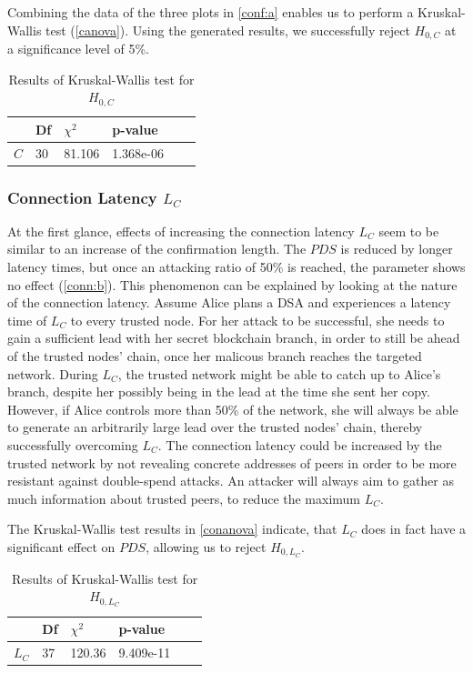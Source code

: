 \documentclass[a4paper,12pt,twoside]{report}
\begin{document}
Combining the data of the three plots in \autoref{conf:a} enables us to perform a Kruskal-Wallis test (\autoref{canova}). Using the generated results, we successfully reject $H_{0,C}$ at a significance level of 5\%.
\begin{table}[hb]
\centering
\begin{tabular}{|l|l|l|l|l|l|} \hline
& Df & $\chi^{2}$ & p-value \\ \hline
$C$ & 30 & 81.106 & 1.368e-06 \\ \hline
\end{tabular}
\caption{Results of Kruskal-Wallis test for $H_{0,C}$}
\label{canova}
\end{table}
\subsubsection{Connection Latency $L_C$}
At the first glance, effects of increasing the connection latency $L_C$ seem to be similar to an increase of the confirmation length. The $PDS$ is reduced by longer latency times, but once an attacking ratio of 50\% is reached, the parameter shows no effect (\autoref{conn:b}). This phenomenon can be explained by looking at the nature of the connection latency. Assume Alice plans a DSA and experiences a latency time of $L_C$ to every trusted node. For her attack to be successful, she needs to gain a sufficient lead with her secret blockchain branch, in order to still be ahead of the trusted nodes' chain, once her malicous branch reaches the targeted network. During $L_C$, the trusted network might be able to catch up to Alice's branch, despite her possibly being in the lead at the time she sent her copy. However, if Alice controls more than 50\% of the network, she will always be able to generate an arbitrarily large lead over the trusted nodes' chain, thereby successfully overcoming $L_C$. The connection latency could be increased by the trusted network by not revealing concrete addresses of peers in order to be more resistant against double-spend attacks. An attacker will always aim to gather as much information about trusted peers, to reduce the maximum $L_C$.

The Kruskal-Wallis test results in \autoref{conanova} indicate, that $L_C$ does in fact have a significant effect on $PDS$, allowing us to reject $H_{0,L_C}$.
\begin{table}[hb]
\centering
\begin{tabular}{|l|l|l|l|l|l|} \hline
& Df & $\chi^{2}$ & p-value \\ \hline
$L_C$ & 37 &  120.36 & 9.409e-11 \\ \hline
\end{tabular}
\caption{Results of Kruskal-Wallis test for $H_{0,L_C}$}
\label{conanova}
\end{table}
\end{document}
